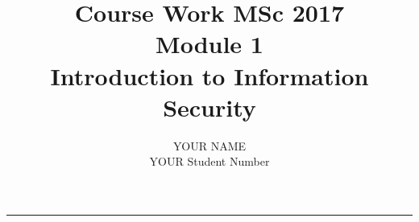 \documentclass[12pt, british]{article}
\begin{document}
%

\title{Course Work MSc 2017\\
Module 1\\
Introduction to Information Security}


\author{YOUR NAME\\
YOUR Student Number}

\maketitle
\noindent \begin{center}
\rule[0.5ex]{1\linewidth}{1pt}
\par\end{center}









  
 
\end{document}
